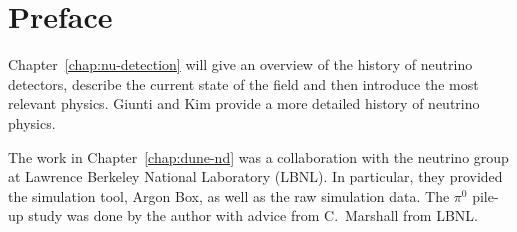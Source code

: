 \renewcommand{\Chapter}{Preface}
\chapter*{\Chapter}
\chaptermark{\Chapter}

Chapter~\ref{chap:nu-detection} will give an overview of the history of neutrino detectors, describe the current state of the field and then introduce the most relevant physics.
Giunti and Kim provide a more detailed history of neutrino physics.~\cite{giunti}

The work in Chapter~\ref{chap:dune-nd} was a collaboration with the neutrino group at Lawrence Berkeley National Laboratory (LBNL).
In particular, they provided the simulation tool, Argon Box, as well as the raw simulation data.
The $\pi^0$ pile-up study was done by the author with advice from C.\ Marshall from LBNL.
